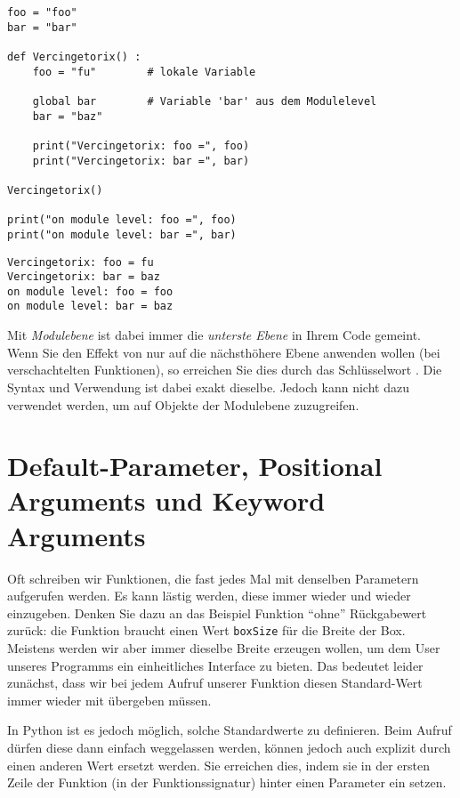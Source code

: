 \begin{codebox}
\begin{verbatim}
foo = "foo"
bar = "bar"

def Vercingetorix() :
    foo = "fu"        # lokale Variable
  
    global bar        # Variable 'bar' aus dem Modulelevel
    bar = "baz"

    print("Vercingetorix: foo =", foo)
    print("Vercingetorix: bar =", bar)

Vercingetorix()

print("on module level: foo =", foo)
print("on module level: bar =", bar)
\end{verbatim}
\end{codebox}
\begin{cmdbox}
\begin{verbatim}
Vercingetorix: foo = fu
Vercingetorix: bar = baz
on module level: foo = foo
on module level: bar = baz
\end{verbatim}
\end{cmdbox}

Mit \emph{Modulebene} ist dabei immer die \emph{unterste Ebene} in Ihrem Code gemeint. Wenn Sie den Effekt von  nur auf die nächsthöhere Ebene anwenden wollen (\eg bei verschachtelten Funktionen), so erreichen Sie dies durch das Schlüsselwort . Die Syntax und Verwendung ist dabei exakt dieselbe. Jedoch kann  nicht dazu verwendet werden, um auf Objekte der Modulebene zuzugreifen.

\section{Default-Parameter, Positional Arguments und Keyword Arguments}
Oft schreiben wir Funktionen, die fast jedes Mal mit denselben Parametern aufgerufen werden. Es kann lästig werden, diese immer wieder und wieder einzugeben. Denken Sie dazu an das Beispiel Funktion \enquote{ohne} Rückgabewert zurück: die Funktion  braucht einen Wert \texttt{boxSize} für die Breite der Box. Meistens werden wir aber immer dieselbe Breite erzeugen wollen, um dem User unseres Programms ein einheitliches Interface zu bieten. Das bedeutet leider zunächst, dass wir bei jedem Aufruf unserer Funktion  diesen Standard-Wert immer wieder mit übergeben müssen.

In Python ist es jedoch möglich, solche Standardwerte zu definieren. Beim Aufruf dürfen diese dann einfach weggelassen werden, können jedoch auch explizit durch einen anderen Wert ersetzt werden. Sie erreichen dies, indem sie in der ersten Zeile der Funktion (in der Funktionssignatur) hinter einen Parameter ein   setzen.

